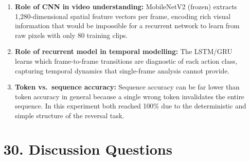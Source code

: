 \documentclass[10pt]{article}
\begin{document}
\begin{enumerate}
\item \textbf{Role of CNN in video understanding:} MobileNetV2 (frozen) extracts
1,280-dimensional spatial feature vectors per frame, encoding rich visual
information that would be impossible for a recurrent network to learn from raw
pixels with only 80 training clips.

\item \textbf{Role of recurrent model in temporal modelling:} The LSTM/GRU
learns which frame-to-frame transitions are diagnostic of each action class,
capturing temporal dynamics that single-frame analysis cannot provide.

\item \textbf{Token vs.\ sequence accuracy:} Sequence accuracy can be far lower
than token accuracy in general because a single wrong token invalidates the
entire sequence. In this experiment both reached 100\% due to the deterministic
and simple structure of the reversal task.
\end{enumerate}

\section*{30. Discussion Questions}
\end{document}
